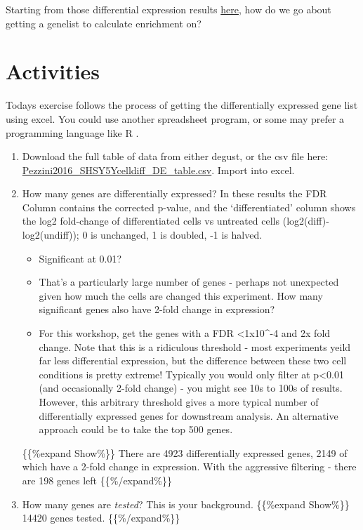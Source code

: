 \documentclass[
]{book}
\begin{document}
Starting from those differential expression results \href{http://degust.erc.monash.edu/degust/compare.html?code=5b2c7805ab8f8c5f2dc8c72e61b049b0\#?plot=mds}{here}, how do we go about getting a genelist to calculate enrichment on?

\section{Activities}\label{activities}

Todays exercise follows the process of getting the differentially expressed gene list using excel. You could use another spreadsheet program, or some may prefer a programming language like R .

\begin{enumerate}
\def\labelenumi{\arabic{enumi}.}
\item
  Download the full table of data from either degust, or the csv file here:
  \href{https://monashbioinformaticsplatform.github.io/enrichment_analysis_workshop/data/Pezzini2016_SHSY5Ycelldiff_DE_table.csv}{Pezzini2016\_SHSY5Ycelldiff\_DE\_table.csv}. Import into excel.
\item
  How many genes are differentially expressed? In these results the FDR Column contains the corrected p-value, and the `differentiated' column shows the log2 fold-change of differentiated cells vs untreated cells (log2(diff)-log2(undiff)); 0 is unchanged, 1 is doubled, -1 is halved.

  \begin{itemize}
  \item
    Significant at 0.01?
  \item
    That's a particularly large number of genes - perhaps not unexpected given how much the cells are changed this experiment. How many significant genes also have 2-fold change in expression?
  \item
    For this workshop, get the genes with a FDR \textless1x10\^{}-4 and 2x fold change. Note that this is a ridiculous threshold - most experiments yeild far less differential expression, but the difference between these two cell conditions is pretty extreme! Typically you would only filter at p\textless0.01 (and occasionally 2-fold change) - you might see 10s to 100s of results. However, this arbitrary threshold gives a more typical number of differentially expressed genes for downstream analysis. An alternative approach could be to take the top 500 genes.
  \end{itemize}

  \{\{\%expand Show\%\}\} There are 4923 differentially expressed genes, 2149 of which have a 2-fold change in expression. With the aggressive filtering - there are 198 genes left \{\{\%/expand\%\}\}
\item
  How many genes are \emph{tested}? This is your background.
  \{\{\%expand Show\%\}\} 14420 genes tested. \{\{\%/expand\%\}\}
\end{enumerate}
\end{document}
